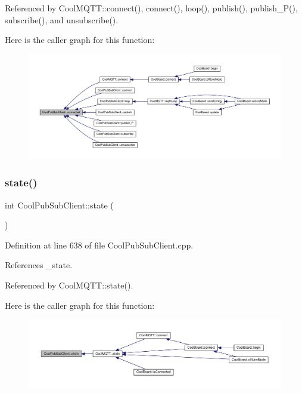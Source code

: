 Referenced by Cool\+M\+Q\+T\+T\+::connect(), connect(), loop(), publish(), publish\+\_\+\+P(), subscribe(), and unsubscribe().

Here is the caller graph for this function\+:\nopagebreak
\begin{figure}[H]
\begin{center}
\leavevmode
\includegraphics[width=350pt]{d8/d4b/class_cool_pub_sub_client_a3d5a5da4ddb1e5c1bea64d80c665d148_icgraph}
\end{center}
\end{figure}
\mbox{\label{class_cool_pub_sub_client_a3245a5afc6d22e61270dcfe392ccb866}} 
\subsubsection{\texorpdfstring{state()}{state()}}
{\footnotesize\ttfamily int Cool\+Pub\+Sub\+Client\+::state (\begin{DoxyParamCaption}{ }\end{DoxyParamCaption})}



Definition at line 638 of file Cool\+Pub\+Sub\+Client.\+cpp.



References \+\_\+state.



Referenced by Cool\+M\+Q\+T\+T\+::state().

Here is the caller graph for this function\+:\nopagebreak
\begin{figure}[H]
\begin{center}
\leavevmode
\includegraphics[width=350pt]{d8/d4b/class_cool_pub_sub_client_a3245a5afc6d22e61270dcfe392ccb866_icgraph}
\end{center}
\end{figure}
\mbox{\label{class_cool_pub_sub_client_a4f83e54f1ba96e32f725d93cdec283b7}} 
